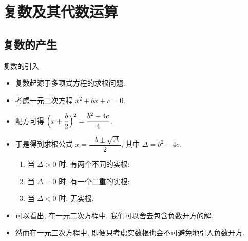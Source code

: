 \section{复数及其代数运算}

\subsection{复数的产生}

\begin{frame}{复数的引入\noexer}
	\begin{itemize}
		\item 复数起源于多项式方程的求根问题.
		\item 考虑一元二次方程 $x^2+bx+c=0$.
		\item 配方可得 $\Bigl(x+\dfrac b2\Bigr)^2=\dfrac{b^2-4c}4$.
		\item 于是得到求根公式 $x=\dfrac{-b\pm\sqrt\Delta}2$, 其中 $\Delta=b^2-4c$.
		\begin{enumerate}
			\item 当 $\Delta>0$ 时, 有两个不同的实根;
			\item 当 $\Delta=0$ 时, 有一个二重的实根;
			\item 当 $\Delta<0$ 时, 无实根.
		\end{enumerate}
		\item 可以看出, 在一元二次方程中, 我们可以舍去包含\alert{负数开方}的解.
		\item 然而在一元三次方程中, 即便只考虑实数根也会不可避免地引入负数开方.
	\end{itemize}
\end{frame}



